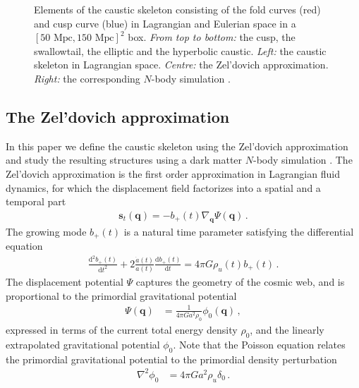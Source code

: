 \documentclass[a4paper, 11pt]{article}
\begin{document}
\begin{figure}
\begin{subfigure}[b]{0.28\textwidth}
\end{subfigure}
\caption{Elements of the caustic skeleton consisting of the fold curves (red) and cusp curve (blue) in Lagrangian and Eulerian space in a $[50\text{ Mpc}, 150 \text{ Mpc}]^2$ box. \textit{From top to bottom:} the cusp, the swallowtail, the elliptic and the hyperbolic caustic. \textit{Left:} the caustic skeleton in Lagrangian space. \textit{Centre:} the Zel'dovich approximation. \textit{Right:} the corresponding $N$-body simulation \cite{Hidding:2020}.}\label{fig:caustics_Examples_Big}
\end{figure}

\subsection{The Zel'dovich approximation}\label{sec:Zeldovich}
In this paper we define the caustic skeleton using the Zel'dovich approximation \cite{Zeldovich:1970} and study the resulting structures using a dark matter $N$-body simulation \cite{Hidding:2020}. The Zel'dovich approximation is the first order approximation in Lagrangian fluid dynamics, for which the displacement field factorizes into a spatial and a temporal part
\begin{align}
\bm{s}_t(\bm{q}) = - b_+(t) \nabla_{\bm{q}} \Psi(\bm{q})\,.
\end{align}
The growing mode $b_+(t)$ is a natural time parameter satisfying the differential equation
\begin{align}
\frac{\mathrm{d}^2 b_+(t)}{\mathrm{d}t^2} + 2 \frac{\dot{a}(t)}{a(t)} \frac{\mathrm{d} b_+(t)}{\mathrm{d}t} = 4 \pi G \rho_u(t) b_+(t)\,.
\end{align}
The displacement potential $\Psi$ captures the geometry of the cosmic web, and is proportional to the primordial gravitational potential
\begin{align}
\Psi(\bm{q}) &=\frac{1}{4 \pi G a^2 \rho_0}\phi_0(\bm{q})%
\,,
\end{align}
expressed in terms of the current total energy density %
$\rho_0$,
and the linearly extrapolated gravitational potential $\phi_0$. Note that the Poisson equation relates the primordial gravitational potential to the primordial density perturbation
\begin{align}
\nabla ^2 \phi_0 &= 4 \pi G a^2 \rho_u \delta_0\,.%
\end{align}
\end{document}
